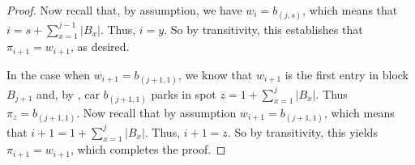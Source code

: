 \documentclass[10pt,a4paper]{amsart}
\begin{document}
\begin{proof}
    Now recall that, by assumption, we have $w_i=b_{(j,s)}$, which means that $i=s+\sum_{x=1}^{j-1}|B_x|$. Thus, $i=y$. 
    So by transitivity,  this establishes that 
    $\pi_{i+1}=w_{i+1}$, as desired.
    
    In the case when $w_{i+1}=b_{(j+1,1)}$, we know that $w_{i+1}$ is the first entry in block $B_{j+1}$ and, by , car $b_{(j+1,1)}$ parks in spot 
    $z=1+\sum_{x=1}^j|B_x|$.
    Thus $\pi_{z}=b_{(j+1,1)}$.
    Now recall that by assumption $w_{i+1}=b_{(j+1,1)}$, which means that $i+1=1+\sum_{x=1}^{j}|B_x|$. Thus, $i+1=z$.  
    So by transitivity, this yields 
    $\pi_{i+1}=w_{i+1}$, which completes the proof.
\end{proof}
\end{document}
